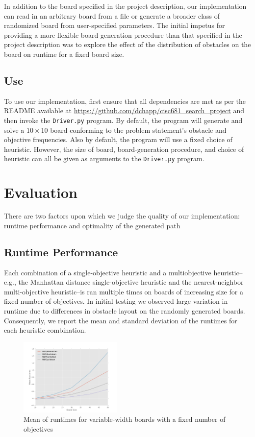 \documentclass[12pt, conference, compsocconf]{IEEEtran}
\begin{document}
In addition to the board specified in the project description, our
implementation can read in an arbitrary board from a file or generate a broader
class of randomized board from user-specified parameters.  The initial impetus
for providing a more flexible board-generation procedure than that specified in
the project description was to explore the effect of the distribution of
obstacles on the board on runtime for a fixed board size.

\subsection{Use}
To use our implementation, first ensure that all dependencies are met as per
the README available at \url{https://github.com/dchapp/cisc681_search_project}
and then invoke the \texttt{Driver.py} program.  By default, the program will
generate and solve a $10 \times 10$ board conforming to the problem statement's
obstacle and objective frequencies.  Also by default, the program will use a
fixed choice of heuristic.  However, the size of board, board-generation
procedure, and choice of heuristic can all be given as arguments to the
\texttt{Driver.py} program.

\section{Evaluation}
There are two factors upon which we judge the quality of our implementation:
runtime performance and optimality of the generated path

\subsection{Runtime Performance}
Each combination of a single-objective heuristic and a multiobjective
heuristic--e.g., the Manhattan distance single-objective heuristic and the
nearest-neighbor multi-objective heuristic--is ran multiple times on boards of
increasing size for a fixed number of objectives.  In initial testing we
observed large variation in runtime due to differences in obstacle layout on
the randomly generated boards.  Consequently, we report the mean and standard
deviation of the runtimes for each heuristic combination.

\begin{figure}[h!]
    \centering
    \includegraphics[width=0.45\textwidth]{runtimes.png}
    \caption{Mean of runtimes for variable-width boards with a fixed number of objectives}
    \label{runtimes-fig}
\end{figure}
\end{document}
